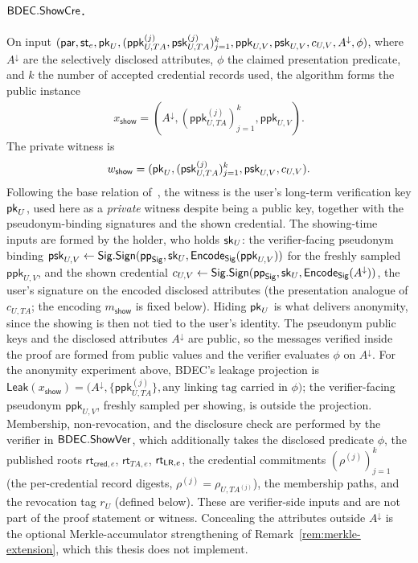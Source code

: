 \begin{construction}
\paragraph{$\mathsf{BDEC}.\mathsf{ShowCre}$.}
On input $(\mathsf{par},\mathsf{st}_e,\mathsf{pk}_U,(\mathsf{ppk}_{U,TA}^{(j)},\mathsf{psk}_{U,TA}^{(j)})_{j=1}^{k},\mathsf{ppk}_{U,V},\mathsf{psk}_{U,V},c_{U,V},A^\downarrow,\phi)$, where $A^\downarrow$ are the selectively disclosed attributes, $\phi$ the claimed presentation predicate, and $k$ the number of accepted credential records used, the algorithm forms the public instance
\begin{equation*}
\begin{aligned}
  x_{\mathsf{show}}
  =
  (A^\downarrow,(\mathsf{ppk}_{U,TA}^{(j)})_{j=1}^{k},\mathsf{ppk}_{U,V}).
\end{aligned}
\end{equation*}
The private witness is
\begin{equation*}
\begin{aligned}
  w_{\mathsf{show}}
  =
  (\mathsf{pk}_U,(\mathsf{psk}_{U,TA}^{(j)})_{j=1}^{k},\mathsf{psk}_{U,V},c_{U,V}).
\end{aligned}
\end{equation*}
Following the base relation of~\cite{10.1007/978-981-96-0957-4_3}, the witness is the user's long-term verification key $\mathsf{pk}_U$, used here as a \emph{private} witness despite being a public key, together with the pseudonym-binding signatures and the shown credential. The showing-time inputs are formed by the holder, who holds $\mathsf{sk}_U$: the verifier-facing pseudonym binding $\mathsf{psk}_{U,V}\leftarrow\mathsf{Sig}.\mathsf{Sign}(\mathsf{pp}_{\mathsf{Sig}},\mathsf{sk}_U,\mathsf{Encode}_{\mathsf{Sig}}(\mathsf{ppk}_{U,V}))$ for the freshly sampled $\mathsf{ppk}_{U,V}$, and the shown credential $c_{U,V}\leftarrow\mathsf{Sig}.\mathsf{Sign}(\mathsf{pp}_{\mathsf{Sig}},\mathsf{sk}_U,\mathsf{Encode}_{\mathsf{Sig}}(A^\downarrow))$, the user's signature on the encoded disclosed attributes (the presentation analogue of $c_{U,TA}$; the encoding $m_{\mathsf{show}}$ is fixed below). Hiding $\mathsf{pk}_U$ is what delivers anonymity, since the showing is then not tied to the user's identity. The pseudonym public keys and the disclosed attributes $A^\downarrow$ are public, so the messages verified inside the proof are formed from public values and the verifier evaluates $\phi$ on $A^\downarrow$. For the anonymity experiment above, BDEC's leakage projection is $\mathsf{Leak}(x_{\mathsf{show}})=\bigl(A^\downarrow,\{\mathsf{ppk}_{U,TA}^{(j)}\},\text{any linking tag carried in }\phi\bigr)$; the verifier-facing pseudonym $\mathsf{ppk}_{U,V}$, freshly sampled per showing, is outside the projection. Membership, non-revocation, and the disclosure check are performed by the verifier in $\mathsf{BDEC}.\mathsf{ShowVer}$, which additionally takes the disclosed predicate $\phi$, the published roots $\mathsf{rt}_{\mathsf{cred},e}$, $\mathsf{rt}_{TA,e}$, $\mathsf{rt}_{\mathsf{LR},e}$, the credential commitments $(\rho^{(j)})_{j=1}^{k}$ (the per-credential record digests, $\rho^{(j)}=\rho_{U,TA^{(j)}}$), the membership paths, and the revocation tag $r_U$ (defined below). These are verifier-side inputs and are not part of the proof statement or witness. Concealing the attributes outside $A^\downarrow$ is the optional Merkle-accumulator strengthening of Remark~\ref{rem:merkle-extension}, which this thesis does not implement.


\end{construction}
